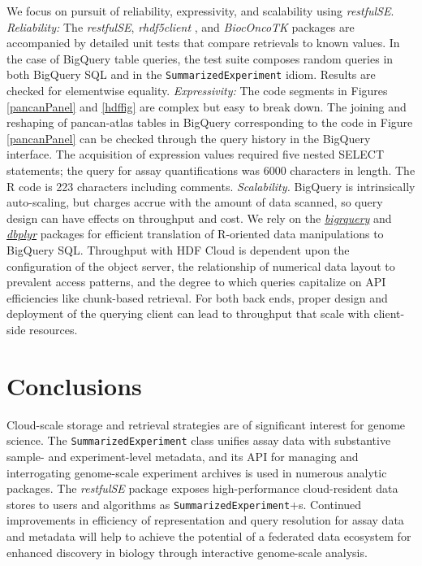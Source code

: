 \documentclass[applications]{gen-bioinformatics}
\newcommand{\Biocpackage}[1]{{\textit{#1}}}
\newcommand{\CRANpackage}[1]{{\emph{\href{https://cran.r-project.org/web/packages/#1/index.html}{#1}}}}
\newcommand{\CRANpackageFirst}[1]{{\emph{\href{https://cran.r-project.org/web/packages/#1/index.html}{#1}}}}
\newcommand{\Rclass}[1]{{\texttt{#1}}}
\begin{document}
We focus on pursuit of reliability,
expressivity, and scalability using \Biocpackage{restfulSE}.  
\textit{Reliability:} 
The \Biocpackage{restfulSE}, \Biocpackage{rhdf5client} \citep{rclient},
and \Biocpackage{BiocOncoTK} \citep{bionc} packages are accompanied by detailed unit
tests that compare retrievals to known values.  In the
case of BigQuery table queries, the test
suite composes random queries 
in both BigQuery SQL and in the \texttt{SummarizedExperiment} 
idiom.  Results
are checked for elementwise equality.  \textit{Expressivity:} The code
segments in Figures \ref{pancanPanel} and \ref{hdffig} are
complex but easy to break down.  The joining and
reshaping of pancan-atlas tables in BigQuery corresponding
to the code in Figure \ref{pancanPanel}
can be checked through the query history in the BigQuery
interface.  The acquisition of expression values required
five nested SELECT statements; the query for assay quantifications
was 6000 characters in length.
The R code is 223 characters including comments.
\textit{Scalability.}  BigQuery is intrinsically auto-scaling,
but charges accrue with the amount of data scanned, 
so query design can have effects on throughput
and cost.  We rely on the \CRANpackage{bigrquery} \citep{bigr} and \CRANpackageFirst{dbplyr} \citep{dbp} packages for
efficient translation of R-oriented data manipulations to 
BigQuery SQL.  Throughput with HDF Cloud 
is dependent upon the configuration of the object server,
the relationship of numerical data layout to prevalent access
patterns, and the degree to which queries capitalize on
API efficiencies like chunk-based retrieval.  For both
back ends, proper design and deployment of the querying client can
lead to throughput that scale with client-side resources.

\section*{Conclusions}

Cloud-scale storage and retrieval strategies are of significant
interest for genome science.  The \Rclass{SummarizedExperiment} class
unifies assay data with substantive sample- and experiment-level
metadata, and its API for managing and interrogating
genome-scale experiment archives is used in numerous
analytic packages.  The \Biocpackage{restfulSE} package exposes high-performance
cloud-resident data stores to users and
algorithms as \texttt{SummarizedExperiment}+s.  Continued improvements
in efficiency of
representation and query resolution for assay data and metadata
will help to achieve the potential of a federated data ecosystem for
enhanced discovery in biology through interactive genome-scale analysis.
\end{document}

